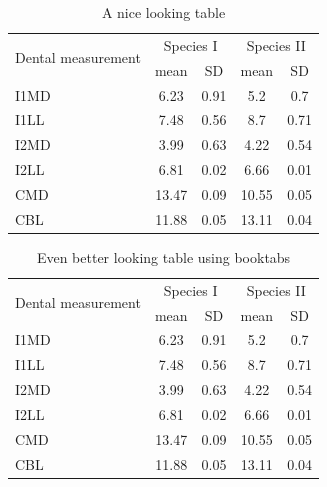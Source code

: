 \documentclass[a4paper,12pt,times,print,index,custombib,custommargin]{PhDThesisPSnPDF}\usepackage[]{graphicx}\usepackage[]{color}
\begin{document}
\begin{table}
\caption{A nice looking table}
\centering
\label{table:nice_table}
\begin{tabular}{l c c c c}
\hline 
\multirow{2}{*}{Dental measurement} & \multicolumn{2}{c}{Species I} & \multicolumn{2}{c}{Species II} \\ 
\cline{2-5}
  & mean & SD  & mean & SD  \\ 
\hline
I1MD & 6.23 & 0.91 & 5.2  & 0.7  \\

I1LL & 7.48 & 0.56 & 8.7  & 0.71 \\

I2MD & 3.99 & 0.63 & 4.22 & 0.54 \\

I2LL & 6.81 & 0.02 & 6.66 & 0.01 \\

CMD & 13.47 & 0.09 & 10.55 & 0.05 \\

CBL & 11.88 & 0.05 & 13.11 & 0.04\\ 
\hline 
\end{tabular}
\end{table}


\begin{table}
\caption{Even better looking table using booktabs}
\centering
\label{table:good_table}
\begin{tabular}{l c c c c}
\toprule
\multirow{2}{*}{Dental measurement} & \multicolumn{2}{c}{Species I} & \multicolumn{2}{c}{Species II} \\ 
\cmidrule{2-5}
  & mean & SD  & mean & SD  \\ 
\midrule
I1MD & 6.23 & 0.91 & 5.2  & 0.7  \\

I1LL & 7.48 & 0.56 & 8.7  & 0.71 \\

I2MD & 3.99 & 0.63 & 4.22 & 0.54 \\

I2LL & 6.81 & 0.02 & 6.66 & 0.01 \\

CMD & 13.47 & 0.09 & 10.55 & 0.05 \\

CBL & 11.88 & 0.05 & 13.11 & 0.04\\ 
\bottomrule
\end{tabular}
\end{table}




\end{document}
